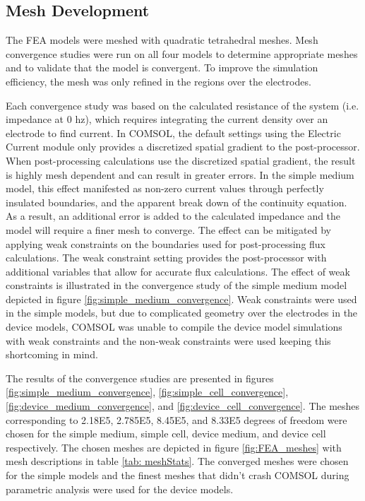 \subsection{Mesh Development}

\par The FEA models were meshed with quadratic tetrahedral meshes.  Mesh convergence studies were run on all four models to determine appropriate meshes and to validate that the model is convergent. To improve the simulation efficiency, the mesh was only refined in the regions over the electrodes. 

\par Each convergence study was based on the calculated resistance of the system (i.e. impedance at 0 hz), which requires integrating the current density over an electrode to find current. In COMSOL, the default settings using the Electric Current module only provides a discretized spatial gradient to the post-processor. When post-processing calculations use the discretized spatial gradient, the result is highly mesh dependent and can result in greater errors. In the simple medium model, this effect manifested as non-zero current values through perfectly insulated boundaries, and the apparent break down of the continuity equation. As a result, an additional error is added to the calculated impedance and the model will require a finer mesh to converge. The effect can be mitigated by applying weak constraints on the boundaries used for post-processing flux calculations. The weak constraint setting provides the post-processor with additional variables that allow for accurate flux calculations. The effect of weak constraints is illustrated in the convergence study of the simple medium model depicted in figure \ref{fig:simple_medium_convergence}. Weak constraints were used in the simple models, but due to complicated geometry over the electrodes in the device models, COMSOL was unable to compile the device model simulations with weak constraints and the non-weak constraints were used keeping this shortcoming in mind.

\par The results of the convergence studies are presented in figures \ref{fig:simple_medium_convergence}, \ref{fig:simple_cell_convergence}, \ref{fig:device_medium_convergence}, and \ref{fig:device_cell_convergence}. The meshes corresponding to 2.18E5, 2.785E5, 8.45E5, and 8.33E5 degrees of freedom were chosen for the simple medium, simple cell, device medium, and device cell respectively. The chosen meshes are depicted in figure \ref{fig:FEA_meshes} with mesh descriptions in table \ref{tab: meshStats}. The converged meshes were chosen for the simple models and the finest meshes that didn't crash COMSOL during parametric analysis were used for the device models. 

